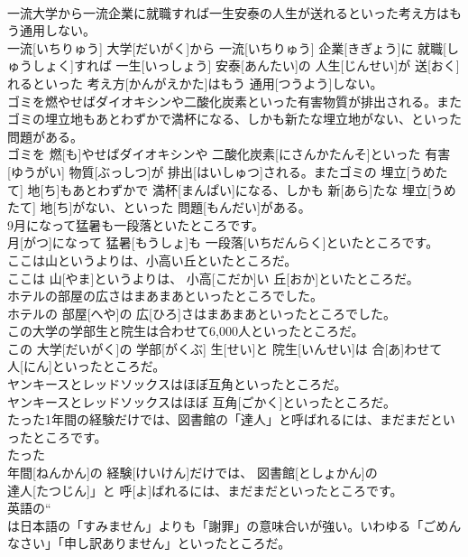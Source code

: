 \documentclass[8pt]{extreport}
\begin{document}
\begin{CJK}{UTF8}{min}
\\	一流大学から一流企業に就職すれば一生安泰の人生が送れるといった考え方はもう通用しない。	
\\	一流[いちりゅう] 大学[だいがく]から 一流[いちりゅう] 企業[きぎょう]に 就職[しゅうしょく]すれば 一生[いっしょう] 安泰[あんたい]の 人生[じんせい]が 送[おく]れるといった 考え方[かんがえかた]はもう 通用[つうよう]しない。
\\	ゴミを燃やせばダイオキシンや二酸化炭素といった有害物質が排出される。またゴミの埋立地もあとわずかで満杯になる、しかも新たな埋立地がない、といった問題がある。	
\\	ゴミを 燃[も]やせばダイオキシンや 二酸化炭素[にさんかたんそ]といった 有害[ゆうがい] 物質[ぶっしつ]が 排出[はいしゅつ]される。またゴミの 埋立[うめたて] 地[ち]もあとわずかで 満杯[まんぱい]になる、しかも 新[あら]たな 埋立[うめたて] 地[ち]がない、といった 問題[もんだい]がある。
\\	9月になって猛暑も一段落といたところです。	
\\	月[がつ]になって 猛暑[もうしょ]も 一段落[いちだんらく]といたところです。
\\	ここは山というよりは、小高い丘といたところだ。	
\\	ここは 山[やま]というよりは、 小高[こだか]い 丘[おか]といたところだ。
\\	ホテルの部屋の広さはまあまあといったところでした。	
\\	ホテルの 部屋[へや]の 広[ひろ]さはまあまあといったところでした。
\\	この大学の学部生と院生は合わせて6,000人といったところだ。	
\\	この 大学[だいがく]の 学部[がくぶ] 生[せい]と 院生[いんせい]は 合[あ]わせて 
\\	人[にん]といったところだ。
\\	ヤンキースとレッドソックスはほぼ互角といったところだ。	
\\	ヤンキースとレッドソックスはほぼ 互角[ごかく]といったところだ。
\\	たった1年間の経験だけでは、図書館の「達人」と呼ばれるには、まだまだといったところです。	
\\	たった 
\\	年間[ねんかん]の 経験[けいけん]だけでは、 図書館[としょかん]の
\\	達人[たつじん]」と 呼[よ]ばれるには、まだまだといったところです。
\\	英語の“
\\	は日本語の「すみません」よりも「謝罪」の意味合いが強い。いわゆる「ごめんなさい」「申し訳ありません」といったところだ。	

\end{CJK}
\end{document}
